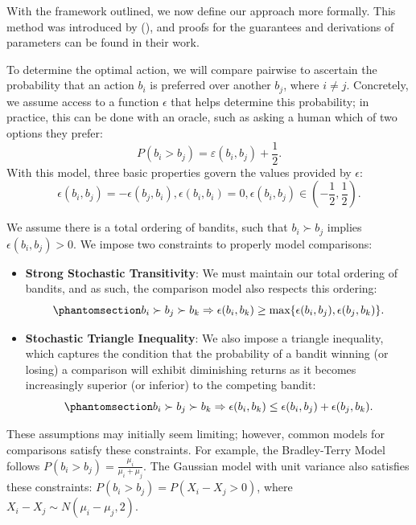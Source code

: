 \documentclass[
  letterpaper,
  numbers=noenddot,
  DIV=11]{scrreprt}
\theoremstyle{definition}
\theoremstyle{plain}
\theoremstyle{plain}
\theoremstyle{remark}
\begin{document}
With the framework outlined, we now define our approach more formally.
This method was introduced by (), and proofs for the guarantees and derivations of parameters can
be found in their work.

To determine the optimal action, we will compare pairwise to ascertain
the probability that an action \(b_i\) is preferred over another
\(b_j\), where \(i \ne j\). Concretely, we assume access to a function
\(\epsilon\) that helps determine this probability; in practice, this
can be done with an oracle, such as asking a human which of two options
they prefer: \[P(b_i > b_j) = \varepsilon(b_i, b_j) + \frac{1}{2}.\]
With this model, three basic properties govern the values provided by
\(\epsilon\):
\[\epsilon(b_i, b_j) = -\epsilon(b_j, b_i), \epsilon(b_i, b_i) = 0, \epsilon(b_i, b_j) \in \left(-\frac{1}{2}, \frac{1}{2} \right).\]

We assume there is a total ordering of bandits, such that
\(b_i \succ b_j\) implies \(\epsilon(b_i, b_j) > 0\). We impose two
constraints to properly model comparisons:

\begin{itemize}
\item
  \textbf{Strong Stochastic Transitivity}: We must maintain our total
  ordering of bandits, and as such, the comparison model also respects
  this ordering:
  \begin{equation}\phantomsection\label{eq-stochastic-transitivity}{b_i \succ b_j \succ b_k \Rightarrow \epsilon(b_i, b_k) \ge \text{max}\{\epsilon(b_i, b_j), \epsilon(b_j, b_k)\}.}\end{equation}
\item
  \textbf{Stochastic Triangle Inequality}: We also impose a triangle
  inequality, which captures the condition that the probability of a
  bandit winning (or losing) a comparison will exhibit diminishing
  returns as it becomes increasingly superior (or inferior) to the
  competing bandit:
  \begin{equation}\phantomsection\label{eq-triangle-inequality}{b_i \succ b_j \succ b_k \Rightarrow \epsilon(b_i, b_k) \le \epsilon(b_i, b_j) + \epsilon(b_j, b_k).}\end{equation}
\end{itemize}

These assumptions may initially seem limiting; however, common models
for comparisons satisfy these constraints. For example, the
Bradley-Terry Model follows
\(P(b_i > b_j) = \frac{\mu_i}{\mu_i + \mu_j}\). The Gaussian model with
unit variance also satisfies these constraints:
\(P(b_i > b_j) = P(X_i - X_j > 0)\), where
\(X_i - X_j \sim N(\mu_i - \mu_j, 2)\).
\end{document}

